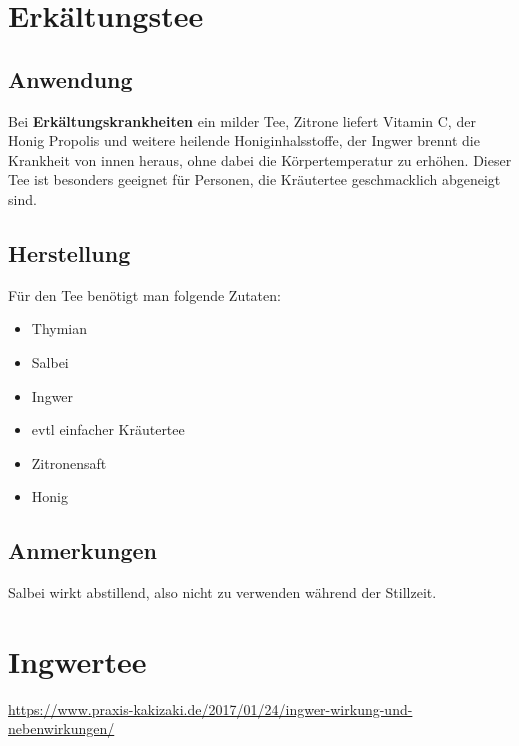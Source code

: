 \newpage


\section{Erkältungstee}



\subsection{Anwendung}

Bei \textbf{Erkältungskrankheiten} ein milder Tee, Zitrone liefert Vitamin C, der Honig Propolis und weitere heilende Honiginhalsstoffe, der Ingwer brennt die Krankheit von innen heraus, ohne dabei die Körpertemperatur zu erhöhen. Dieser Tee ist besonders geeignet für Personen, die Kräutertee geschmacklich abgeneigt sind.

\subsection{Herstellung}

Für den Tee benötigt man folgende Zutaten:

\begin{itemize}
	\item Thymian
	\item Salbei
	\item Ingwer
	\item evtl einfacher Kräutertee
	\item Zitronensaft
	\item Honig
\end{itemize}


\subsection{Anmerkungen}

Salbei wirkt abstillend, also nicht zu verwenden während der Stillzeit.


\newpage



\section{Ingwertee}


\url{https://www.praxis-kakizaki.de/2017/01/24/ingwer-wirkung-und-nebenwirkungen/}

